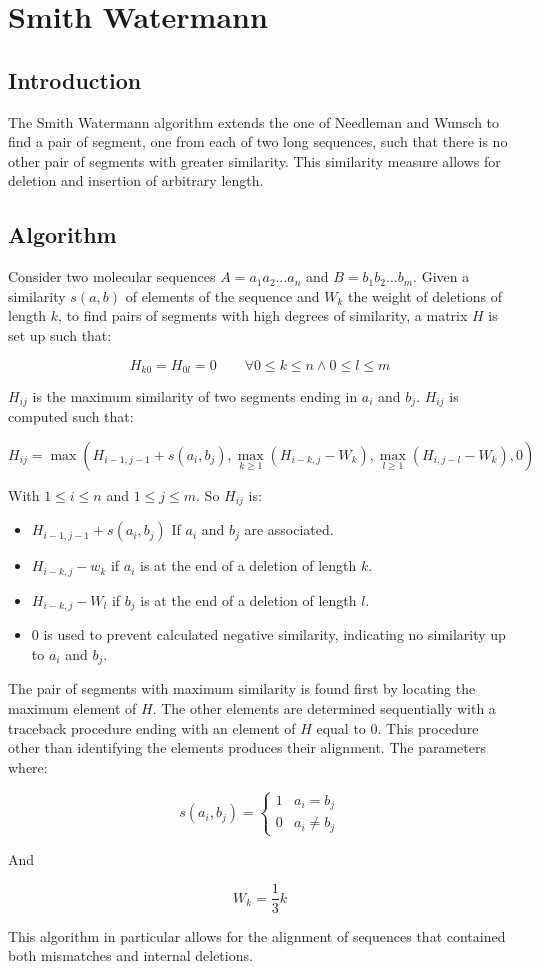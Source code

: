 \graphicspath{{chapters/02/images}}
\chapter{Smith Watermann}

\section{Introduction}
The Smith Watermann algorithm extends the one of Needleman and Wunsch to find a pair of segment, one from each of two long sequences, such that there is no other pair of segments with greater similarity.
This similarity measure allows for deletion and insertion of arbitrary length.

\section{Algorithm}
Consider two molecular sequences $A = a_1a_2\dots a_n$ and $B = b_1b_2\dots b_m$.
Given a similarity $s(a,b)$ of elements of the sequence and $W_k$ the weight of deletions of length $k$, to find pairs of segments with high degrees of similarity, a matrix $H$ is set up such that:

$$H_{k0} = H_{0l} = 0\qquad \forall 0\le k\le n\land 0\le l\le m$$

$H_{ij}$ is the maximum similarity of two segments ending in $a_i$ and $b_j$.
$H_{ij}$ is computed such that:

$$H_{ij} = \max(H_{i-1, j-1} + s(a_i, b_j), \max\limits_{k\ge 1}(H_{i-k, j}-W_k), \max\limits_{l\ge 1}(H_{i, j-l}-W_k), 0)$$

With $1\le i\le n$ and $1\le j\le m$.
So $H_{ij}$ is:

\begin{multicols}{2}
	\begin{itemize}
		\item $H_{i-1, j-1} + s(a_i, b_j)$ If $a_i$ and $b_j$ are associated.
		\item $H_{i-k, j}-w_k$ if $a_i$ is at the end of a deletion of length $k$.
		\item $H_{i-k, j}-W_l$ if $b_j$ is at the end of a deletion of length $l$.
		\item $0$ is used to prevent calculated negative similarity, indicating no similarity up to $a_i$ and $b_j$.
	\end{itemize}
\end{multicols}

The pair of segments with maximum similarity is found first by locating the maximum element of $H$.
The other elements are determined sequentially with a traceback procedure ending with an element of $H$ equal to $0$.
This procedure other than identifying the elements produces their alignment.
The parameters  where:

$$s(a_i, b_j) = \begin{cases} 1 & a_i = b_j \\ 0 & a_i\neq b_j\end{cases}$$

And

$$W_k = \frac{1}{3}k$$

This algorithm in particular allows for the alignment of sequences that contained both mismatches and internal deletions.
